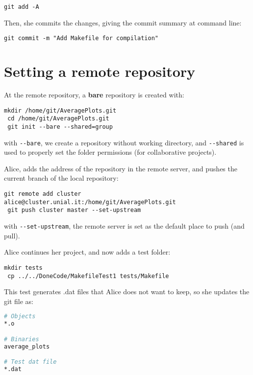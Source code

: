 \documentclass[a4paper,10pt]{article}
\begin{document}
\begin{lstlisting}[style=Alice]
 git add -A
\end{lstlisting}

Then, she commits the changes, giving the commit summary at command line:

\begin{lstlisting}[style=Alice]
 git commit -m "Add Makefile for compilation"
\end{lstlisting}

\clearpage

\section{Setting a remote repository}
At the remote repository, a \textbf{bare} repository is created with:

\begin{lstlisting}[style=Remote]
 mkdir /home/git/AveragePlots.git 
 cd /home/git/AveragePlots.git 
 git init --bare --shared=group
\end{lstlisting}
with \texttt{-{}-bare}, we create a repository without working directory, and \texttt{-{}-shared} is used to properly set the folder permissions (for collaborative projects).

Alice, adds the address of the repository in the remote server, and pushes the current branch of the local repository: 

\begin{lstlisting}[style=Alice]
 git remote add cluster alice@cluster.unial.it:/home/git/AveragePlots.git
 git push cluster master --set-upstream 
\end{lstlisting}
with \texttt{-{}-set-upstream}, the remote server is set as the default place to push (and pull).

Alice continues her project, and now adds a test folder:

\begin{lstlisting}[style=AliceFake]
 mkdir tests
 cp ../../DoneCode/MakefileTest1 tests/Makefile
\end{lstlisting}

This test generates .dat files that Alice does not want to keep, so she updates the git file as:

\begin{lstlisting}[style=Text,language=bash,commentstyle=\color{blue}]
# Objects
*.o

# Binaries
average_plots

# Test dat file
*.dat
\end{lstlisting}
\end{document}
